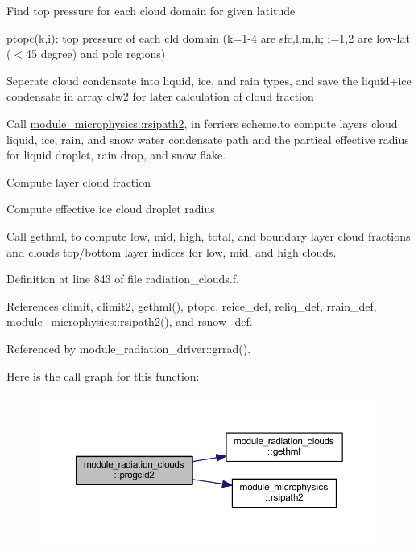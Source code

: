 \begin{DoxyEnumerate}
\item Find top pressure for each cloud domain for given latitude
\begin{DoxyItemize}
\item ptopc(k,i)\+: top pressure of each cld domain (k=1-\/4 are sfc,l,m,h; i=1,2 are low-\/lat ($<$45 degree) and pole regions)
\end{DoxyItemize}
\item Seperate cloud condensate into liquid, ice, and rain types, and save the liquid+ice condensate in array clw2 for later calculation of cloud fraction
\item Call \hyperlink{group__module__radiation__clouds_ga3645dec44f2cc7e30b57d32531f74ba4}{module\+\_\+microphysics\+::rsipath2}, in ferrier\textquotesingle{}s scheme,to compute layer\textquotesingle{}s cloud liquid, ice, rain, and snow water condensate path and the partical effective radius for liquid droplet, rain drop, and snow flake.
\item Compute layer cloud fraction
\item Compute effective ice cloud droplet radius
\item Call gethml, to compute low, mid, high, total, and boundary layer cloud fractions and clouds top/bottom layer indices for low, mid, and high clouds. 
\end{DoxyEnumerate}

Definition at line 843 of file radiation\+\_\+clouds.\+f.



References climit, climit2, gethml(), ptopc, reice\+\_\+def, reliq\+\_\+def, rrain\+\_\+def, module\+\_\+microphysics\+::rsipath2(), and rsnow\+\_\+def.



Referenced by module\+\_\+radiation\+\_\+driver\+::grrad().



Here is the call graph for this function\+:
\nopagebreak
\begin{figure}[H]
\begin{center}
\leavevmode
\includegraphics[width=350pt]{group__module__radiation__clouds_ga1651dc559f22ee01b28dd49fd25112d6_cgraph}
\end{center}
\end{figure}




